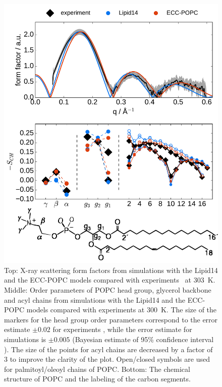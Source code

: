 \documentclass[12pt,a4paper,twoside,openright]{report}
\begin{document}
\begin{figure}[tb!] 
  \centering 
  \includegraphics[width=\figwidth]{../img/ecc_popc/Order-parameters_form-factors_exp-L14-ECCL17_q80_sig89_POPC-struct.pdf} 
  \caption{ \label{fig:simVSexpNOions} 
    Top: X-ray scattering form factors from simulations with the Lipid14 \citep{dickson14} and 
    the ECC-POPC \citep{melcr18} models compared with experiments~\citep{kucerka11} at 303~K. 
    Middle: Order parameters of POPC head group, glycerol backbone and acyl chains  
    from simulations with the Lipid14 and the ECC-POPC models 
    compared with experiments \citep{ferreira13} at 300~K. 
    The size of the markers for the head group order parameters correspond to 
    the error estimate $\pm 0.02$ for experiments \citep{botan15,ollila16}, 
    while the error estimate for simulations is $\pm 0.005$
    (Bayesian estimate of 95\% confidence interval \citep{scipy}).
    The size of the points for acyl chains are decreased by a factor of 3 to improve the clarity of the plot.
    Open/closed symbols are used for palmitoyl/oleoyl chains of POPC. 
    Bottom: The chemical structure of POPC and the labeling of the carbon segments. 
  }  
\end{figure} 
\end{document}
